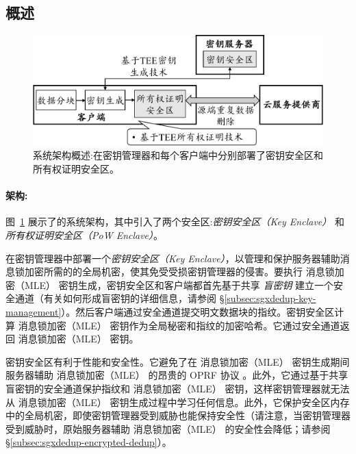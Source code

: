 \subsection{概述}
\label{subsec:sgxdedup-arch}

\begin{figure}[t]
\centering
\includegraphics[width=\textwidth]{pic/sgxdedup/sgxdedup-arch.pdf}
\caption{\sysnameS 系统架构概述:\sysnameS 在密钥管理器和每个客户端中分别部署了密钥安全区和所有权证明安全区。}
\label{fig:sgxdedup-overview}
\vspace{-3pt}
\end{figure}

\paragraph*{架构:} 图~\ref{fig:sgxdedup-overview} 展示了\sysnameS 的系统架构，其中引入了两个安全区:\textit{密钥安全区（Key Enclave）} 和 \textit{所有权证明安全区（PoW Enclave）}。 

\sysnameS 在密钥管理器中部署一个\textit{密钥安全区（Key Enclave）}，以管理和保护服务器辅助消息锁加密所需的的全局机密，使其免受受损密钥管理器的侵害。要执行 消息锁加密（MLE） 密钥生成，密钥安全区和客户端都首先基于共享 \textit{盲密钥} 建立一个安全通道（有关如何形成盲密钥的详细信息，请参阅 \S\ref{subsec:sgxdedup-key-management}）。然后客户端通过安全通道提交明文数据块的指纹。密钥安全区计算 消息锁加密（MLE） 密钥作为全局秘密和指纹的加密哈希。它通过安全通道返回 消息锁加密（MLE） 密钥。

密钥安全区有利于性能和安全性。它避免了在 消息锁加密（MLE） 密钥生成期间服务器辅助 消息锁加密（MLE） 的昂贵的 OPRF 协议 \cite{bellare2013DupLESS}。此外，它通过基于共享盲密钥的安全通道保护指纹和 消息锁加密（MLE） 密钥，这样密钥管理器就无法从 消息锁加密（MLE） 密钥生成过程中学习任何信息。此外，它保护安全区内存中的全局机密，即使密钥管理器受到威胁也能保持安全性（请注意，当密钥管理器受到威胁时，原始服务器辅助 消息锁加密（MLE） 的安全性会降低；请参阅 \S\ref{subsec:sgxdedup-encrypted-dedup}）。

